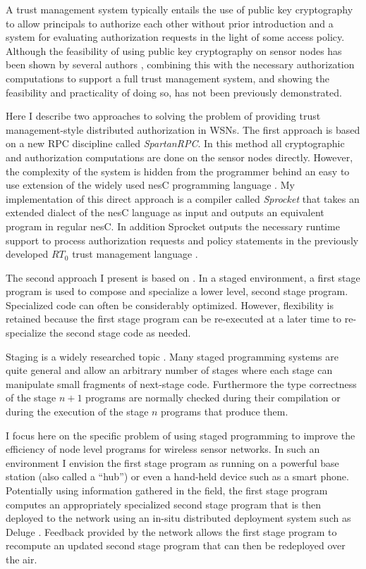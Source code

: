 A trust management system typically entails the use of public key cryptography to allow
principals to authorize each other without prior introduction and a system for evaluating
authorization requests in the light of some access policy. Although the feasibility of using
public key cryptography on sensor nodes has been shown by several authors
\cite{1049776,Malan:2008:IPI:1387663.1387668,bertoni-2006,kumar-2006,4604657,Liu-Peng-TinyECC-2008,Szczechowiak:2008:NTL:1786014.1786040},
combining this with the necessary authorization computations to support a full trust management
system, and showing the feasibility and practicality of doing so, has not been previously
demonstrated.

Here I describe two approaches to solving the problem of providing trust management-style
distributed authorization in WSNs. The first approach is based on a new RPC discipline called
\textit{SpartanRPC}. In this method all cryptographic and authorization computations are done on
the sensor nodes directly. However, the complexity of the system is hidden from the programmer
behind an easy to use extension of the widely used nesC programming language
\cite{Gay-nesC-2003}. My implementation of this direct approach is a compiler called
\textit{Sprocket} that takes an extended dialect of the nesC language as input and outputs an
equivalent program in regular nesC. In addition Sprocket outputs the necessary runtime support
to process authorization requests and policy statements in the previously developed $RT_0$ trust
management language \cite{Li:DRBTMF,Li:RRBTMF}.

The second approach I present is based on . In a staged environment,
a first stage program is used to compose and specialize a lower level, second stage program.
Specialized code can often be considerably optimized. However, flexibility is retained because
the first stage program can be re-executed at a later time to re-specialize the second stage
code as needed.

Staging is a widely researched topic
\cite{Taha-MetaML,Sheard-TemplateHaskell,Mainland-Flask-2008,FramedML}. Many staged programming
systems are quite general and allow an arbitrary number of stages where each stage can
manipulate small fragments of next-stage code. Furthermore the type correctness of the stage
$n+1$ programs are normally checked during their compilation or during the execution of the
stage $n$ programs that produce them.

I focus here on the specific problem of using staged programming to improve the efficiency of
node level programs for wireless sensor networks. In such an environment I envision the first
stage program as running on a powerful base station (also called a ``hub'') or even a hand-held
device such as a smart phone. Potentially using information gathered in the field, the first
stage program computes an appropriately specialized second stage program that is then deployed
to the network using an in-situ distributed deployment system such as Deluge \cite{deluge04}.
Feedback provided by the network allows the first stage program to recompute an updated second
stage program that can then be redeployed over the air.

